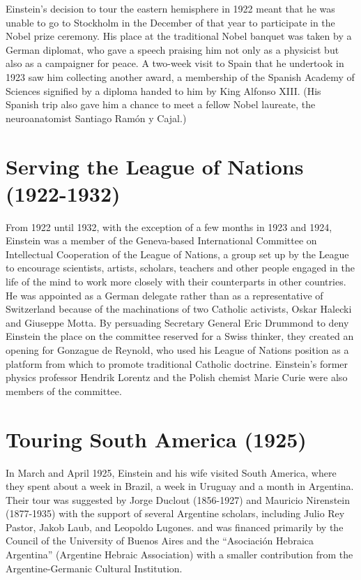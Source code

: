 \documentclass[twoside]{memoir}
\begin{document}
Einstein's decision to tour the eastern hemisphere in 1922 meant that he was unable to go to Stockholm in the December of that year to participate in the Nobel prize ceremony. His place at the traditional Nobel banquet was taken by a German diplomat, who gave a speech praising him not only as a physicist but also as a campaigner for peace.\cite{oxak7} A two-week visit to Spain that he undertook in 1923 saw him collecting another award, a membership of the Spanish Academy of Sciences signified by a diploma handed to him by King Alfonso XIII.  (His Spanish trip also gave him a chance to meet a fellow Nobel laureate, the neuroanatomist Santiago Ramón y Cajal.)\cite{w74nv}

\chapter{Serving the League of Nations (1922-1932)}\label{serving-the-league-of-nations-1922-1932}

From 1922 until 1932, with the exception of a few months in 1923 and 1924,  Einstein was a member of the Geneva-based International Committee on Intellectual Cooperation of the League of Nations, a group set up by the League to encourage scientists, artists, scholars, teachers and other people engaged in the life of the mind to work more closely with their counterparts in other countries.\cite{Q5hgx}\cite{vNNnX} He was appointed as a German delegate rather than as a representative of Switzerland because of the machinations of two Catholic activists, Oskar Halecki and Giuseppe Motta. By persuading Secretary General Eric Drummond to deny Einstein the place on the committee reserved for a Swiss thinker, they created an opening for Gonzague de Reynold,  who used his League of Nations position as a platform from which to promote traditional Catholic doctrine.\cite{e9Xyh} Einstein's former physics professor Hendrik Lorentz and the Polish chemist Marie Curie were also members of the committee.\cite{1926}

\chapter{Touring South America (1925)}\label{touring-south-america-1925}

In March and April 1925, Einstein and his wife visited South America, where they spent about a week in Brazil, a week in Uruguay and a month in Argentina.\cite{Tolmasquim_2011} Their tour was suggested by Jorge Duclout (1856-1927) and Mauricio Nirenstein  (1877-1935)\cite{Gangui_2008} with the support of several Argentine scholars, including Julio Rey Pastor,  Jakob Laub, and Leopoldo Lugones. and was financed primarily by the Council of the University of Buenos Aires and the \enquote{Asociación Hebraica Argentina} (Argentine Hebraic Association) with a smaller contribution from the Argentine-Germanic Cultural Institution.
\end{document}
